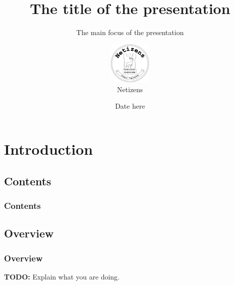 \documentclass{beamer}
\title[Crisis]{The title of the presentation}
\subtitle{The main focus of the presentation}
\author{
  \includegraphics[height=2cm,width=2cm]{logo-black} \\
  Netizens
}
\institute{
  \inst{1}
  Cyber Security
  \\
  Computer Science
  \\
  University of Hertfordshire
}
\date{Date here}
\begin{document}
  \section*{}
    \frame{\titlepage}
  \section{Introduction}
    \subsection{Contents}
      \begin{frame}
        \frametitle{Contents}
        \tableofcontents[hideallsubsections]
      \end{frame}
    \subsection{Overview}
      \begin{frame}
        \frametitle{Overview}
        \textbf{TODO:} Explain what you are doing.
      \end{frame}
\end{document}
